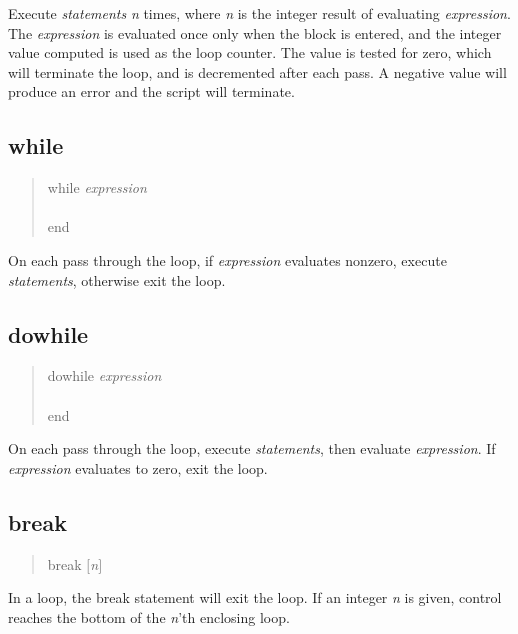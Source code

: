 Execute {\it statements\/} {\it n} times, where {\it n\/} is the
integer result of evaluating {\it expression}.  The {\it expression}
is evaluated once only when the block is entered, and the integer
value computed is used as the loop counter.  The value is tested for
zero, which will terminate the loop, and is decremented after each
pass.  A negative value will produce an error and the script will
terminate.

\subsection{\vt while}

\begin{quote}
{\vt while} {\it expression}\\
\hspace*{2em}{\it statements}\\
{\vt end}
\end{quote}

On each pass through the loop, if {\it expression\/} evaluates nonzero,
execute {\it statements\/}, otherwise exit the loop.

\subsection{\vt dowhile}

\begin{quote}
{\vt dowhile} {\it  expression}\\
\hspace*{2em}{\it statements}\\
{\vt end}
\end{quote}
  
On each pass through the loop, execute {\it statements\/}, then
evaluate {\it expression\/}.  If {\it expression\/} evaluates to zero,
exit the loop.

\subsection{\vt break}

\begin{quote}
\noindent
{\vt break} $[${\it n\/}$]$
\end{quote}

In a loop, the {\vt break} statement will exit the loop.  If an
integer {\it n\/} is given, control reaches the bottom of the {\it n\/}'th
enclosing loop.

